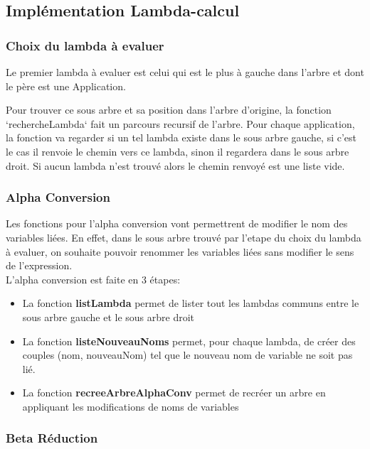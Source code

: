\documentclass[a4paper,11pt,titlepage]{article}
\begin{document}
\subsection{Implémentation Lambda-calcul}

\subsubsection{Choix du lambda à evaluer}

Le premier lambda à evaluer est celui qui est le plus à gauche dans l'arbre et dont le père est une Application.

Pour trouver ce sous arbre et sa position dans l'arbre d'origine, la fonction `rechercheLambda` fait un parcours recursif de l'arbre.
Pour chaque application, la fonction va regarder si un tel lambda existe dans le sous arbre gauche, si c'est le cas il renvoie le chemin vers ce lambda,
 sinon il regardera dans le sous arbre droit. Si aucun lambda n'est trouvé alors le chemin renvoyé est une liste vide.

\subsubsection{Alpha Conversion}


Les fonctions pour l'alpha conversion vont permettrent de modifier le nom des variables liées. En effet, dans le sous arbre trouvé par 
l'etape du choix du lambda à evaluer, on souhaite pouvoir renommer les variables liées sans modifier le sens de l'expression.\\

L'alpha conversion est faite en 3 étapes:
\begin{itemize}
 \item La fonction \textbf{listLambda} permet de lister tout les lambdas communs entre le sous arbre gauche et le sous arbre droit
 \item La fonction \textbf{listeNouveauNoms} permet, pour chaque lambda, de créer des couples (nom, nouveauNom) tel que le nouveau
nom de variable ne soit pas lié.
 \item La fonction \textbf{recreeArbreAlphaConv} permet de recréer un arbre en appliquant les modifications de noms de variables
\end{itemize}


\subsubsection{Beta Réduction}
\end{document}
